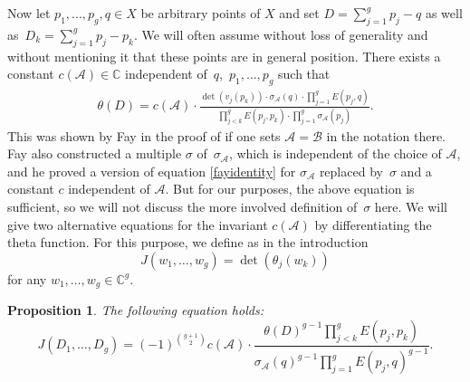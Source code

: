 \documentclass[10pt,a4paper]{amsart}
\numberwithin{equation}{section}
\newtheorem{Proposition}[Theorem]{Proposition}
 { \theoremstyle{definition}
\newtheorem{Definition}[Theorem]{Definition}
\newtheorem{Note}[Theorem]{Note}
\newtheorem{Example}[Theorem]{Example}
\newtheorem{Remark}[Theorem]{Remark} }
\begin{document}
Now let $p_1,\dots,p_g,q\in X$ be arbitrary points of $X$ and set $D=\sum_{j=1}^gp_j-q$ as well as~${D_k=\sum_{j=1}^gp_j-p_k}$.
We will often assume without loss of generality and without mentioning it that these points are in general position.
There exists a constant $c(\mathcal{A})\in \mathbb{C}$ independent of~$q$,~$p_1,\dots, p_g$ such that
\begin{align}\label{fayidentity}
	\theta(D)=c(\mathcal{A})\cdot\frac{\det(v_j(p_k))\cdot\sigma_{\mathcal{A}}(q)\cdot \prod_{j=1}^g E(p_j,q)}{\prod_{j<k}^{g}E(p_j,p_k)\cdot\prod_{j=1}^g\sigma_{\mathcal{A}}(p_j)}.
\end{align}
This was shown by Fay in the proof of \cite[Corollary 2.17]{Fay73} if one sets $\mathcal{A}=\mathcal{B}$ in the notation there. Fay also constructed a multiple $\sigma$ of~$\sigma_{\mathcal{A}}$, which is independent of the choice of $\mathcal{A}$, and he proved a version of equation \eqref{fayidentity} for $\sigma_{\mathcal{A}}$ replaced by~$\sigma$ and a constant $c$ independent of $\mathcal{A}$. But for our purposes, the above equation is sufficient, so we will not discuss the more involved definition of~$\sigma$ here.
We will give two alternative equations for the invariant $c(\mathcal{A})$ by differentiating the theta function. For this purpose, we define as in the introduction
\[J(w_1,\dots,w_g)=\det(\theta_j(w_k))\]
for any $w_1,\dots,w_g\in\mathbb{C}^g$.
\begin{Proposition}\label{propJ}
	The following equation holds:
	\[
J(D_1,\dots,D_g)=(-1)^{\binom{g+1}{2}} c(\mathcal{A})\cdot\frac{\theta(D)^{g-1}\prod_{j<k}^g E(p_j,p_k)}{\sigma_{\mathcal{A}}(q)^{g-1}\prod_{j=1}^g E(p_j,q)^{g-1}}.\]
\end{Proposition}
\end{document}
